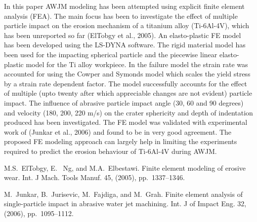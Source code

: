 In this paper AWJM modeling has been attempted using explicit finite element analysis (FEA). The main focus has been to investigate the effect of multiple particle impact on the erosion mechanism of a titanium alloy (Ti-6Al-4V), which has been unreported so far (ElTobgy et al., 2005). An elasto-plastic FE model has been developed using the LS-DYNA software. The rigid material model has been used for the impacting spherical particle and the piecewise linear elasto-plastic model for the Ti alloy workpiece. In the failure model the strain rate was accounted for using the Cowper and Symonds model which scales the yield stress by a strain rate dependent factor. The model successfully accounts for the effect of multiple (upto twenty after which appreciable changes are not evident) particle impact. The influence of abrasive particle impact angle (30, 60 and 90 degrees) and velocity (180, 200, 220 m/s) on the crater sphericity and depth of indentation produced has been investigated. The FE model was validated with experimental work of (Junkar et al., 2006) and found to be in very good agreement. The proposed FE modeling approach can largely help in limiting the experiments required to predict the erosion behaviour of Ti-6Al-4V during AWJM.


\begin{thebibliography}{10}
{\sc M.S.~ElTobgy, E. ~Ng, and M.A.~Elbestawi}. {Finite element modeling of erosive wear}. Int. J Mach. Tools Manuf. 45, (2005), pp.~1337--1346.

{\sc M.~Junkar, B.~Jurisevic, M.~Fajdiga, and M.~Grah}. {Finite element analysis of single-particle impact in abrasive water jet machining}. Int. J of Impact Eng. 32, (2006), pp.~1095--1112.
\end{thebibliography}